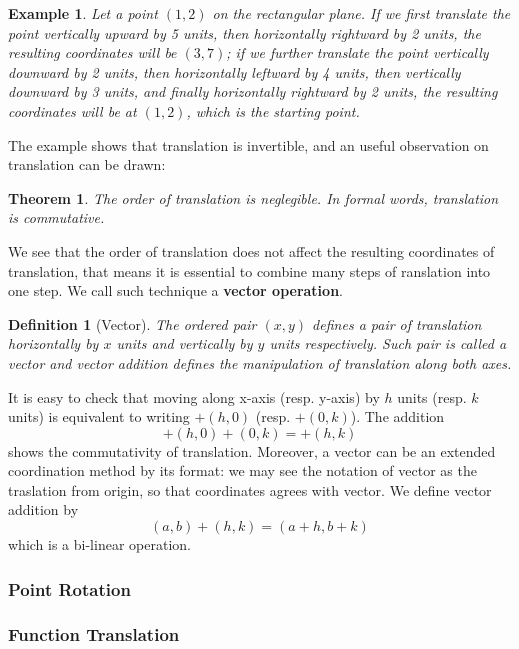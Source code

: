 \documentclass[12pt]{article}
\newtheorem{definition}{Definition}[section]
\newtheorem*{theorem}{Theorem}
\newtheorem*{example}{Example}
\begin{document}
    \begin{example}
        Let a point $(1,2)$ on the rectangular plane. If we first translate the point vertically upward by 5 units, then horizontally rightward by 2 units, the resulting coordinates will be $(3,7)$; if we further translate the point vertically downward by 2 units, then horizontally leftward by 4 units, then vertically downward by 3 units, and finally horizontally rightward by 2 units, the resulting coordinates will be at $(1,2)$, which is the starting point.
    \end{example}

    The example shows that translation is invertible, and an useful observation on translation can be drawn:

    \begin{theorem}
        The order of translation is neglegible. In formal words, translation is commutative.
    \end{theorem}

    We see that the order of translation does not affect the resulting coordinates of translation, that means it is essential to combine many steps of ranslation into one step. We call such technique a \textbf{vector operation}.
    
    \begin{definition}[Vector]
        The ordered pair $(x,y)$ defines a pair of translation horizontally by $x$ units and vertically by $y$ units respectively. Such pair is called a vector and vector addition defines the manipulation of translation along both axes.
    \end{definition}

    It is easy to check that moving along x-axis (resp. y-axis) by $h$ units (resp. $k$ units) is equivalent to writing $+(h,0)$ (resp. $+(0,k)$). The addition \[+(h,0)+(0,k)=+(h,k)\] shows the commutativity of translation. Moreover, a vector can be an extended coordination method by its format: we may see the notation of vector as the traslation from origin, so that coordinates agrees with vector. We define vector addition by \[(a,b)+(h,k)=(a+h,b+k)\] which is a bi-linear operation.

    \subsubsection*{Point Rotation}

    \subsubsection*{Function Translation}
\end{document}
